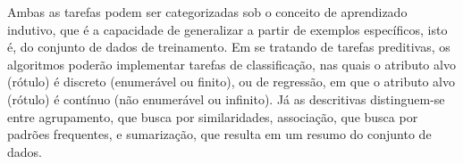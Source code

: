 \documentclass[a4paper,12pt]{book}
\begin{document}
Ambas as tarefas podem ser categorizadas sob o conceito de aprendizado indutivo, que é a capacidade de generalizar a partir de exemplos específicos, isto é, do conjunto de dados de treinamento. Em se tratando de tarefas preditivas, os algoritmos poderão implementar tarefas de classificação, nas quais o atributo alvo (rótulo) é discreto (enumerável ou finito), ou de regressão, em que o atributo alvo (rótulo) é contínuo (não enumerável ou infinito). Já as descritivas distinguem-se entre agrupamento, que busca por similaridades, associação, que busca por padrões frequentes, e sumarização, que resulta em um resumo do conjunto de dados.









%
\end{document}
